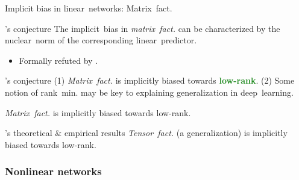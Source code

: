 \documentclass[handout,usenames,dvipsnames]{beamer} %
\newcommand{\true}[1]{{\textcolor{ForestGreen}{\textbf{#1}}}}
\begin{document}
\begin{frame}{Implicit bias in linear~networks: Matrix~fact.}
    \pause
    \begin{block}{\cite{gunasekar2018implicit}’s conjecture }
        The implicit~bias in \emph{matrix~fact.} can be characterized by the \alert{nuclear~norm} of the corresponding linear~predictor.
    \end{block}
    \pause
    \begin{itemize}
        \item \alert{Formally refuted} by \cite{li2020towards}.
    \end{itemize}
    \pause
    \begin{block}{\cite{razin2020implicit}’s conjecture}
        (1) \emph{Matrix~fact.} is implicitly biased towards \true{low-rank}. (2) Some notion of rank~min. may be key to explaining generalization in deep~learning.
    \end{block}
    \pause
    \begin{exampleblock}{\cite{li2020towards} \hfill\checkmark}
        \emph{Matrix~fact.} is implicitly biased towards low-rank.
    \end{exampleblock}
    \pause
    \begin{exampleblock}{\cite{razin2021implicit}’s theoretical \& empirical results \hfill\checkmark}
        \emph{Tensor~fact.} (a generalization) is implicitly biased towards low-rank.
    \end{exampleblock}
    
\end{frame}




\subsubsection{Nonlinear networks}
\end{document}
